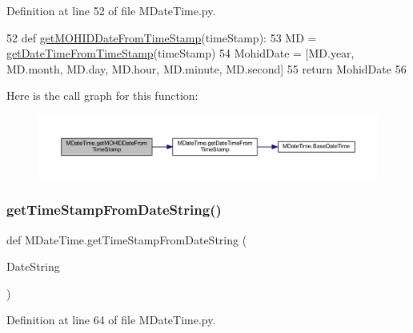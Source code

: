 Definition at line 52 of file M\+Date\+Time.\+py.


\begin{DoxyCode}
52 \textcolor{keyword}{def }\mbox{\hyperlink{namespace_m_date_time_a0bb2bb194a0935f8ffee0022899d73a5}{getMOHIDDateFromTimeStamp}}(timeStamp):
53     MD = \mbox{\hyperlink{namespace_m_date_time_abecc2e4333a1a4191e5b1243cf98131d}{getDateTimeFromTimeStamp}}(timeStamp)
54     MohidDate = [MD.year, MD.month, MD.day, MD.hour, MD.minute, MD.second]
55     \textcolor{keywordflow}{return} MohidDate
56 
\end{DoxyCode}
Here is the call graph for this function\+:\nopagebreak
\begin{figure}[H]
\begin{center}
\leavevmode
\includegraphics[width=350pt]{namespace_m_date_time_a0bb2bb194a0935f8ffee0022899d73a5_cgraph}
\end{center}
\end{figure}
\mbox{\label{namespace_m_date_time_a475b426d30876102774a93f17a71d1af}} 
\subsubsection{\texorpdfstring{get\+Time\+Stamp\+From\+Date\+String()}{getTimeStampFromDateString()}}
{\footnotesize\ttfamily def M\+Date\+Time.\+get\+Time\+Stamp\+From\+Date\+String (\begin{DoxyParamCaption}\item[{}]{Date\+String }\end{DoxyParamCaption})}



Definition at line 64 of file M\+Date\+Time.\+py.


